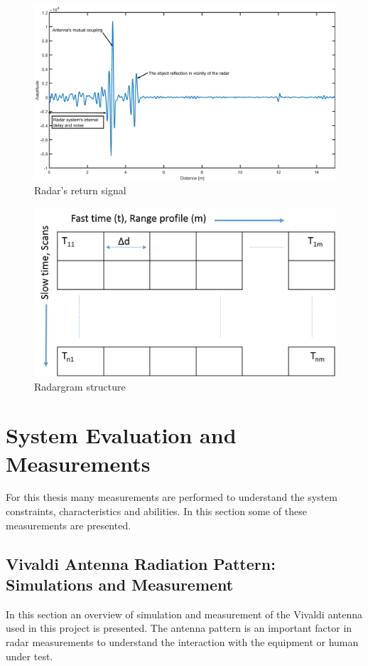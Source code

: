 \begin{figure}
    \centering
    \includegraphics[width=\linewidth]{Figures/RadarReturnSignal.png}
    \caption{Radar's return signal}
    \label{fig:RadarReturnSignal}
\end{figure}
\begin{figure}
    \centering
    \includegraphics[width=\linewidth]{Figures/RadarReturnSignal2D.png}
    \caption{Radargram structure}
    \label{fig:Radargram}
\end{figure}
\section{System Evaluation and Measurements}
For this thesis many measurements are performed to understand the system constraints, characteristics and abilities. In this section some of these measurements are presented.
\subsection{Vivaldi Antenna Radiation Pattern: Simulations and Measurement}
In this section an overview of simulation and measurement of the Vivaldi antenna used in this project is presented. The antenna pattern is an important factor in radar measurements to understand the interaction with the equipment or human under test.

